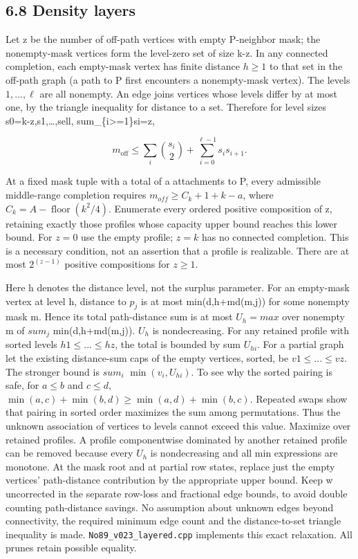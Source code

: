 \documentclass[
  11pt,
]{article}
\begin{document}
\subsection{6.8 Density layers}\label{density-layers}

Let z be the number of off-path vertices with empty P-neighbor mask; the
nonempty-mask vertices form the level-zero set of size k-z. In any
connected completion, each empty-mask vertex has finite distance
\(h\ge 1\) to that set in the off-path graph (a path to P first
encounters a nonempty-mask vertex). The levels \(1,...,\ell\) are all
nonempty. An edge joins vertices whose levels differ by at most one, by
the triangle inequality for distance to a set. Therefore for level sizes
s0=k-z,s1,\ldots,sell, sum\_\{i\textgreater=1\}si=z,

\[m_{\mathrm{off}}\le\sum_i\binom{s_i}{2}+\sum_{i=0}^{\ell-1}s_i s_{i+1}.\]

At a fixed mask tuple with a total of a attachments to P, every
admissible middle-range completion requires \(m_{off}\ge C_{k}+1+k-a\),
where \(C_{k}=A-\operatorname{floor}(k^2/4)\). Enumerate every ordered
positive composition of z, retaining exactly those profiles whose
capacity upper bound reaches this lower bound. For \(z=0\) use the empty
profile; \(z=k\) has no connected completion. This is a necessary
condition, not an assertion that a profile is realizable. There are at
most \(2^(z-1)\) positive compositions for \(z\ge 1\).

Here h denotes the distance level, not the surplus parameter. For an
empty-mask vertex at level h, distance to \(p_{j}\) is at most
min(d,h+md(m,j)) for some nonempty mask m. Hence its total path-distance
sum is at most \(U_{h}=max\) over nonempty m of \(sum_{j}\)
min(d,h+md(m,j)). \(U_{h}\) is nondecreasing. For any retained profile
with sorted levels \(h1\le ...\le hz\), the total is bounded by sum
\(U_{hi}\). For a partial graph let the existing distance-sum caps of
the empty vertices, sorted, be \(v1\le ...\le vz\). The stronger bound
is \(sum_{i}\) \(\operatorname{min}(v_{i},U_{hi})\). To see why the
sorted pairing is safe, for \(a\le b\) and \(c\le d\),
\(\operatorname{min}(a,c)+\operatorname{min}(b,d)\ge \operatorname{min}(a,d)+\operatorname{min}(b,c)\).
Repeated swaps show that pairing in sorted order maximizes the sum among
permutations. Thus the unknown association of vertices to levels cannot
exceed this value. Maximize over retained profiles. A profile
componentwise dominated by another retained profile can be removed
because every \(U_{h}\) is nondecreasing and all min expressions are
monotone. At the mask root and at partial row states, replace just the
empty vertices' path-distance contribution by the appropriate upper
bound. Keep w uncorrected in the separate row-loss and fractional edge
bounds, to avoid double counting path-distance savings. No assumption
about unknown edges beyond connectivity, the required minimum edge count
and the distance-to-set triangle inequality is made.
\texttt{No89\_v023\_layered.cpp} implements this exact relaxation. All
prunes retain possible equality.
\end{document}
